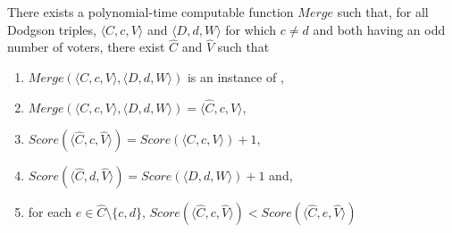 \begin{lemma} \label{lem:merge2}
There exists a polynomial-time computable function $Merge$
    such that, for all Dodgson triples,
    $\langle C,c,V \rangle$ and $\langle D,d,W \rangle$ 
    for which $c\neq d$ and both having an odd number of voters,
    there exist $\hat{C}$ and $\hat{V}$ such that
    \begin{enumerate}
        \item $Merge(\langle C,c,V \rangle, \langle D,d,W \rangle)$
        is an instance of , 
        \item $Merge(\langle C,c,V \rangle, \langle D,d,W \rangle)
        = \langle \hat{C},c,\hat{V} \rangle$,
        \item $Score(\langle \hat{C},c,\hat{V} \rangle) =
        Score(\langle C,c,V \rangle) + 1$,
        \item $Score(\langle \hat{C},d,\hat{V} \rangle) =
        Score(\langle D,d,W \rangle) + 1$ and,
        \item for each $e \in \hat{C}\setminus \{c,d\}$, 
        $Score(\langle \hat{C},c,\hat{V} \rangle) < 
        Score(\langle \hat{C},e,\hat{V} \rangle)$
    \end{enumerate}
\end{lemma}



